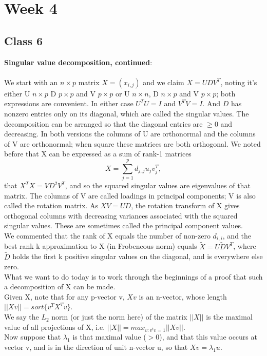 \documentclass[11pt,a4paper]{article}
\begin{document}
\section*{Week 4}

\subsection*{Class 6}

\textbf{Singular value decomposition, continued}:\\\\
We start with an $n\times p$ matrix $X=(x_{i,j})$ and we claim $X = U D V^T$, noting it's either U $n\times p$   D $p\times p$  and V $p \times p$ or U $n \times n$, D $n\times p$ and V $p\times p$; both expressions are convenient. In either case $U^T U = I$ and $V^T V = I$.  And $D$ has nonzero entries only on its diagonal, which are called the singular values. The decomposition can be arranged so that the diagonal entries are $\geq 0$ and decreasing.  In both versions the columns of U are orthonormal and the columns of V are orthonormal; when square these matrices are both orthogonal.  We noted before that X can be expressed as a sum of rank-1 matrices
$$X = \sum_{j=1}^p d_{j,j}  u_j v_j^T,$$
that $X^T X = V D^2 V^T$, and so the squared singular values are eigenvalues of that matrix.  The columns of V are called loadings in principal components; V is also called the rotation matrix.  As $X V = U D$, the rotation transform of X gives orthogonal columns with decreasing variances associated with the squared singular values.  These are sometimes called the principal component values.\\
We commented that the rank of X equals the number of non-zero $d_{i,i}$, and the best rank k approximation to X (in Frobeneous norm) equals $\tilde{X} = U \tilde{D} V^T$, where   $\tilde{D}$ holds the first k positive singular values on the diagonal, and is everywhere else zero.\\
What we want to do today is to work through the beginnings of a proof that such a decomposition of X can be made.\\
Given X, note that for any p-vector v, $Xv$ is an n-vector, whose length $||Xv|| = sort\{ v^T X^T v \}$.\\
We say the $L_2$ norm (or just the norm here) of the matrix $||X||$ is the maximal value of all projections of X, i.e. $|| X || = max_{v: v^t v=1 } ||Xv||$.\\
Now suppose that $\lambda_1$ is that maximal value ($>0$), and that this value occurs at vector v, and is in the direction of unit n-vector u, so that $Xv = \lambda_1 u$.\\
\end{document}
